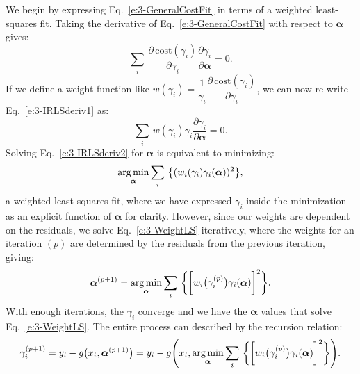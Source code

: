 We begin by expressing Eq.~\ref{e:3-GeneralCostFit} in terms of a weighted least-squares fit.
Taking the derivative of Eq.~\ref{e:3-GeneralCostFit} with respect to $\bm{\alpha}$ gives:
\begin{equation}
  \sum\limits_i\,\frac{\partial \, \textrm{cost}(\gamma_i)}{\partial \gamma_i} \frac{\partial \gamma_i}{\partial \bm{\alpha}} = 0.\label{e:3-IRLSderiv1}
\end{equation}
If we define a weight function like $w(\gamma_i) = \dfrac{1}{\gamma_i}\dfrac{\partial \, \textrm{cost}(\gamma_i)}{\partial \gamma_i}$, we can now re-write Eq.~\ref{e:3-IRLSderiv1} as:
\begin{equation}
  \sum\limits_i\,w(\gamma_i) \gamma_i \frac{\partial \gamma_i}{\partial \bm{\alpha}} = 0.\label{e:3-IRLSderiv2}
\end{equation}
 Solving Eq.~\ref{e:3-IRLSderiv2} for $\bm{\alpha}$ is equivalent to minimizing:
 \begin{equation}
   \operatorname*{arg\,min}_{\bm{\alpha}} \sum\limits_i\,\big \{ (w_i(\gamma_i) \gamma_i(\bm{\alpha}))^2 \big \},\label{e:3-WeightLS}
 \end{equation}
a weighted least-squares fit, where we have expressed $\gamma_i$ inside the minimization as an explicit function of $\bm{\alpha}$ for clarity.
However, since our weights are dependent on the residuals, we solve Eq.~\ref{e:3-WeightLS} iteratively, where the weights for an iteration $(p)$ are determined by the residuals from the previous iteration, giving:
\begin{equation}
  \bm{\alpha}^{(p+1)} = \operatorname*{arg\,min}_{\bm{\alpha}} \sum\limits_i\,\bigg \{ \bigg [w_i \big(\gamma_i^{(p)}\big ) \gamma_i(\bm{\alpha}) \bigg ]^2 \bigg \}.
\end{equation}
With enough iterations, the $\gamma_i$ converge and we have the $\bm{\alpha}$ values that solve Eq.~\ref{e:3-WeightLS}.
The entire process can described by the recursion relation:
\begin{equation}
  \gamma_i^{(p+1)} = y_i - g\big (x_i,\bm{\alpha}^{(p+1)}\big )= y_i - g\Bigg (x_i, \operatorname*{arg\,min}_{\bm{\alpha}} \sum\limits_i\,\bigg \{ \bigg [w_i \big(\gamma_i^{(p)}\big ) \gamma_i(\bm{\alpha}) \bigg ]^2 \bigg \} \Bigg).
\end{equation}

